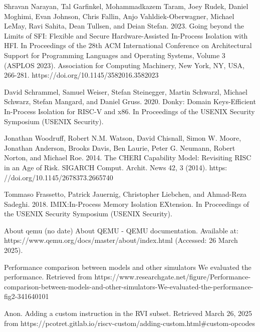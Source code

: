 \documentclass[conference,compsoc]{IEEEtran}
\begin{document}
\begin{thebibliography}{1}

Shravan Narayan, Tal Garfinkel, Mohammadkazem Taram, Joey Rudek, Daniel Moghimi, Evan Johnson, Chris Fallin, Anjo Vahldiek-Oberwagner, Michael LeMay, Ravi Sahita, Dean Tullsen, and Deian Stefan. 2023. Going beyond the Limits of SFI: Flexible and Secure Hardware-Assisted In-Process Isolation with HFI. In Proceedings of the 28th ACM International Conference on Architectural Support for Programming Languages and Operating Systems, Volume 3 (ASPLOS 2023). Association for Computing Machinery, New York, NY, USA, 266-281. https://doi.org/10.1145/3582016.3582023

David Schrammel, Samuel Weiser, Stefan Steinegger, Martin Schwarzl, Michael
Schwarz, Stefan Mangard, and Daniel Gruss. 2020. Donky: Domain Keys-Efficient
In-Process Isolation for RISC-V and x86. In Proceedings of the USENIX Security
Symposium (USENIX Security).

Jonathan Woodruff, Robert N.M. Watson, David Chisnall, Simon W. Moore,
Jonathan Anderson, Brooks Davis, Ben Laurie, Peter G. Neumann, Robert Norton, and Michael Roe. 2014. The CHERI Capability Model: Revisiting RISC
in an Age of Risk. SIGARCH Comput. Archit. News 42, 3 (2014). https:
//doi.org/10.1145/2678373.2665740

Tommaso Frassetto, Patrick Jauernig, Christopher Liebchen, and Ahmad-Reza
Sadeghi. 2018. IMIX:In-Process Memory Isolation EXtension. In Proceedings of
the USENIX Security Symposium (USENIX Security).

About qemu (no date) About QEMU - QEMU documentation. Available at: https://www.qemu.org/docs/master/about/index.html (Accessed: 26 March 2025). 

Performance comparison between models and other simulators We evaluated the performance. Retrieved from https://www.researchgate.net/figure/Performance-comparison-between-models-and-other-simulators-We-evaluated-the-performance-fig2-341640101

Anon. Adding a custom instruction in the RVI subset. Retrieved March 26, 2025 from https://pcotret.gitlab.io/riscv-custom/adding-custom.html#custom-opcodes 

\end{thebibliography}




\end{document}

